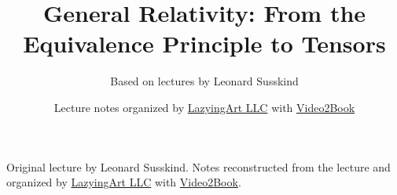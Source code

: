 \documentclass[11pt,oneside]{book}
\begin{document}
\hypersetup{pageanchor=false}
\frontmatter
\title{General Relativity: From the Equivalence Principle to Tensors}
\author{Based on lectures by Leonard Susskind}
\date{Lecture notes organized by \href{https://lazying.art}{LazyingArt LLC} with \href{https://github.com/lachlanchen/Video2Book}{Video2Book}}
\maketitle
\begin{center}
\small Original lecture by Leonard Susskind. Notes reconstructed from the lecture and organized by \href{https://lazying.art}{LazyingArt LLC} with \href{https://github.com/lachlanchen/Video2Book}{Video2Book}.
\end{center}
\clearpage
\hypersetup{pageanchor=true}
\mainmatter

\end{document}
